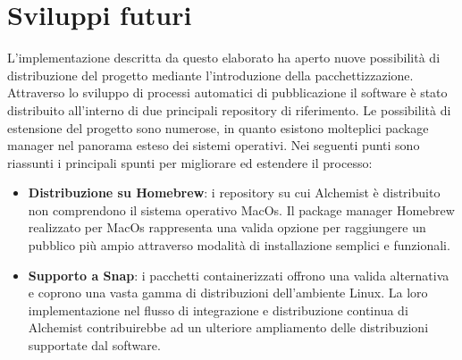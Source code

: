 \section{Sviluppi futuri}
L'implementazione descritta da questo elaborato ha aperto nuove possibilità di distribuzione del progetto mediante l'introduzione della pacchettizzazione. Attraverso lo sviluppo di processi automatici di pubblicazione il software è stato distribuito all'interno di due principali repository di riferimento. Le possibilità di estensione del progetto sono numerose, in quanto esistono molteplici package manager nel panorama esteso dei sistemi operativi. Nei seguenti punti sono riassunti i principali spunti per migliorare ed estendere il processo:
\begin{itemize}
	\item \textbf{Distribuzione su Homebrew}: i repository su cui Alchemist è distribuito non comprendono il sistema operativo MacOs. Il package manager Homebrew realizzato per MacOs rappresenta una valida opzione per raggiungere un pubblico più ampio attraverso modalità di installazione semplici e funzionali.
	\item \textbf{Supporto a Snap}: i pacchetti containerizzati offrono una valida alternativa e coprono una vasta gamma di distribuzioni dell'ambiente Linux. La loro implementazione nel flusso di integrazione e distribuzione continua di Alchemist contribuirebbe ad un ulteriore ampliamento delle distribuzioni supportate dal software. 
\end{itemize}